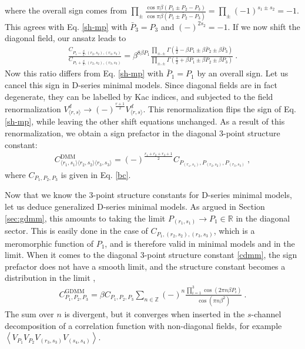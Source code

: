 \documentclass[12pt, a4paper]{article}
\theoremstyle{break}
\begin{document}
where the overall sign comes from $\prod_\pm \frac{\cos \pi\beta(P_1\pm P_2-P_3)}{\cos\pi\beta(\bar P_1\pm \bar P_2-P_3)} = \prod_\pm (-1)^{s_1\pm s_2} = -1$. This agrees with Eq. \eqref{sh-mp} with $\bar P_3=P_3$ and $(-)^{2s_2}=-1$. If we now shift the diagonal field, our ansatz leads to 
\begin{align}
 \frac{C_{P_1-\frac{\beta}{2},(r_2,s_2),(r_3,s_3)}}{C_{P_1+\frac{\beta}{2},(r_2,s_2),(r_3,s_3)}} =\beta^{8\beta P_1}\frac{\prod_{\pm,\pm} \Gamma(\frac12-\beta P_1\pm \beta\bar P_2\pm \beta \bar P_3)}{\prod_{\pm,\pm} \Gamma(\frac12+\beta P_1\pm \beta P_2\pm \beta P_3)}\ .
\end{align}
Now this ratio differs from Eq. \eqref{sh-mp} with $\bar P_1=P_1$ by an overall sign. Let us cancel this sign in D-series minimal models. Since diagonal fields are in fact degenerate, they can be labelled by Kac indices, and subjected to the field renormalization 
$V^d_{\langle r,s\rangle}\to (-)^{\frac{r+1}{2}} V^d_{\langle r,s\rangle}$. 
This renormalization flips the sign of Eq. \eqref{sh-mp}, while leaving the other shift equations unchanged. As a result of this renormalization, we obtain a sign prefactor in the diagonal 3-point structure constant:
\begin{align}
 \boxed{C^\text{DMM}_{\langle r_1,s_1\rangle\langle r_2,s_2\rangle\langle r_3,s_3\rangle} = (-)^\frac{r_1+r_2+r_3+1}{2} C_{P_{(r_1,s_1)},P_{(r_2,s_2)},P_{(r_3,s_3)}}}\ , 
 \label{cdmm}
\end{align}
where $C_{P_1,P_2,P_3}$ is given in Eq. \eqref{bc}.

Now that we know the 3-point structure constants for D-series minimal models, let us deduce generalized D-series minimal models. As argued in Section \ref{sec:gdmm}, this amounts to taking the limit $P_{(r_1,s_1)}\to P_1\in\mathbb{R}$ in the diagonal sector. This is easily done in the case of $C_{P_1,(r_2,s_2),(r_3,s_3)}$, which is a meromorphic function of $P_1$, and is therefore valid in minimal models and in the limit. When it comes to the diagonal 3-point structure constant \eqref{cdmm}, the sign prefactor does not have a smooth limit, and the structure constant becomes a distribution in the limit \cite{rib19},
\begin{align}
 \boxed{C^\text{GDMM}_{P_1,P_2,P_3} = \beta C_{P_1,P_2,P_3}\sum_{n\in\mathbb{Z}}(-)^n \frac{\prod_{i=1}^3 \cos(2\pi n\beta P_i)}{\cos(\pi n\beta^2)}}\ .
 \label{cgdmm}
\end{align}
The sum over $n$ is divergent, but it converges when inserted in the $s$-channel decomposition of a correlation function with non-diagonal fields, for example $\left<V_{P_1}V_{P_2}V_{(r_3,s_3)}V_{(s_4,s_4)}\right>$. 
\end{document}
